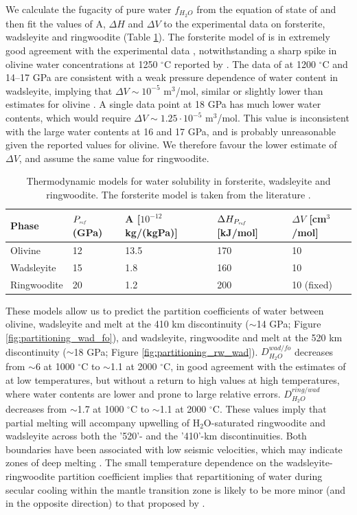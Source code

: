 \documentclass[review]{elsarticle}
\begin{document}
We calculate the fugacity of pure water $f_{H_2O}$ from the equation of state of \cite{PS1995} and then fit the values of A, $\Delta H$ and $\Delta V$ to the experimental data on forsterite, wadsleyite and ringwoodite (Table \ref{table:partitioning}). The forsterite model of \cite{ZGK2004} is in extremely good agreement with the experimental data \citep{SFNHB2006, LSKO2009}, notwithstanding a sharp spike in olivine water concentrations at 1250 $^{\circ}$C reported by \cite{SFNHB2006}. The data of \cite{DDFK2005} at 1200 $^{\circ}$C and 14--17 GPa are consistent with a weak pressure dependence of water content in wadsleyite, implying that $\Delta V \sim 10^{-5}$ m$^3$/mol, similar or slightly lower than estimates for olivine \citep[1.00 -- 1.06 $\cdot 10^{-5}$ m$^3$/mol][]{KKR1996, ZGK2004, MDAR2006}. A single data point at 18 GPa has much lower water contents, which would require $\Delta V \sim 1.25 \cdot 10^{-5}$ m$^3$/mol. This value is inconsistent with the large water contents at 16 and 17 GPa, and is probably unreasonable given the reported values for olivine. We therefore favour the lower estimate of $\Delta V$, and assume the same value for ringwoodite.

\begin{table}[]
\centering
\caption{Thermodynamic models for water solubility in forsterite, wadsleyite and ringwoodite. The forsterite model is taken from the literature \cite{ZGK2004}.}
\label{table:partitioning}
\begin{tabular}{lllll}
Phase & $P_{\textit{\tiny{ref}}}$ (GPa) & A [$10^{-12}$ kg/(kgPa)] & $\Delta H_{P_{\textit{\tiny{ref}}}}$ [kJ/mol] & $\Delta V$ [cm$^3$/mol] \\
\hline
Olivine & 12 & 13.5 & 170 & 10 \\
Wadsleyite & 15 & 1.8 & 160 & 10 \\
Ringwoodite & 20 & 1.2 & 200 & 10 (fixed)
\end{tabular}
\end{table}


These models allow us to predict the partition coefficients of water between olivine, wadsleyite and melt at the 410 km discontinuity ($\sim$14 GPa; Figure \ref{fig:partitioning_wad_fo}), and wadsleyite, ringwoodite and melt at the 520 km discontinuity ($\sim$18 GPa; Figure \ref{fig:partitioning_rw_wad}). $D^{wad/fo}_{H_2O}$ decreases from $\sim$6 at 1000 $^{\circ}$C to $\sim$1.1 at 2000 $^{\circ}$C, in good agreement with the estimates of \cite{LSOK2011} at low temperatures, but without a return to high values at high temperatures, where water contents are lower and prone to large relative errors. $D^{ring/wad}_{H_2O}$ decreases from $\sim$1.7 at 1000 $^{\circ}$C to $\sim$1.1 at 2000 $^{\circ}$C. These values imply that partial melting will accompany upwelling of H$_2$O-saturated ringwoodite and wadsleyite across both the '520'- and the '410'-km discontinuities. Both boundaries have been associated with low seismic velocities, which may indicate zones of deep melting \citep[e.g.][]{JDH2010}. The small temperature dependence on the wadsleyite-ringwoodite partition coefficient implies that repartitioning of water during secular cooling within the mantle transition zone is likely to be more minor (and in the opposite direction) to that proposed by \cite{DDFK2005}. 
\end{document}
